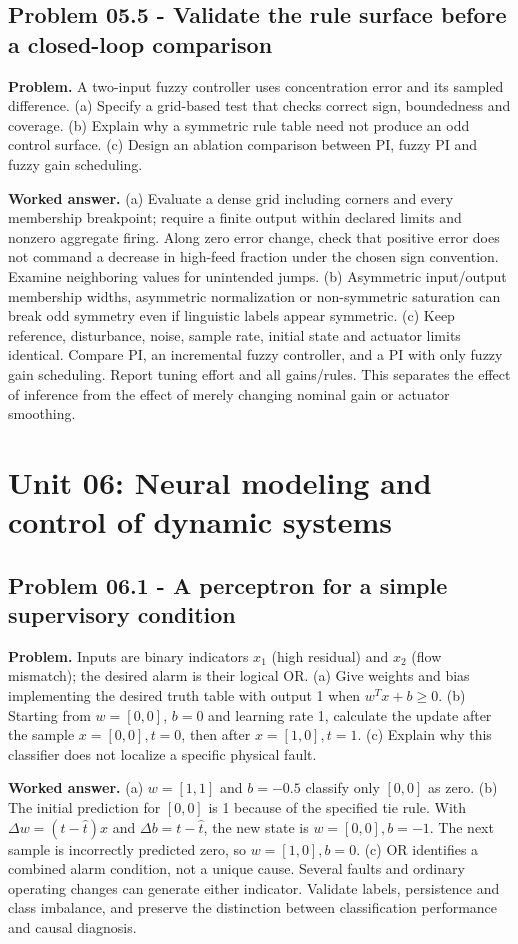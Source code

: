 \documentclass[11pt,a4paper]{article}
\begin{document}
\subsection{Problem 05.5 - Validate the rule surface before a closed-loop comparison}
\textbf{Problem.} A two-input fuzzy controller uses concentration error and its sampled difference. (a) Specify a grid-based test that checks correct sign, boundedness and coverage. (b) Explain why a symmetric rule table need not produce an odd control surface. (c) Design an ablation comparison between PI, fuzzy PI and fuzzy gain scheduling.


\textbf{Worked answer.} (a) Evaluate a dense grid including corners and every membership breakpoint; require a finite output within declared limits and nonzero aggregate firing. Along zero error change, check that positive error does not command a decrease in high-feed fraction under the chosen sign convention. Examine neighboring values for unintended jumps. (b) Asymmetric input/output membership widths, asymmetric normalization or non-symmetric saturation can break odd symmetry even if linguistic labels appear symmetric. (c) Keep reference, disturbance, noise, sample rate, initial state and actuator limits identical. Compare PI, an incremental fuzzy controller, and a PI with only fuzzy gain scheduling. Report tuning effort and all gains/rules. This separates the effect of inference from the effect of merely changing nominal gain or actuator smoothing.


\clearpage\section{Unit 06: Neural modeling and control of dynamic systems}
\subsection{Problem 06.1 - A perceptron for a simple supervisory condition}
\textbf{Problem.} Inputs are binary indicators $x_1$ (high residual) and $x_2$ (flow mismatch); the desired alarm is their logical OR. (a) Give weights and bias implementing the desired truth table with output 1 when $w^Tx+b\geq0$. (b) Starting from $w=[0,0]$, $b=0$ and learning rate 1, calculate the update after the sample $x=[0,0],t=0$, then after $x=[1,0],t=1$. (c) Explain why this classifier does not localize a specific physical fault.


\textbf{Worked answer.} (a) $w=[1,1]$ and $b=-0.5$ classify only $[0,0]$ as zero. (b) The initial prediction for $[0,0]$ is 1 because of the specified tie rule. With $\Delta w=(t-\hat t)x$ and $\Delta b=t-\hat t$, the new state is $w=[0,0],b=-1$. The next sample is incorrectly predicted zero, so $w=[1,0],b=0$. (c) OR identifies a combined alarm condition, not a unique cause. Several faults and ordinary operating changes can generate either indicator. Validate labels, persistence and class imbalance, and preserve the distinction between classification performance and causal diagnosis.
\end{document}
